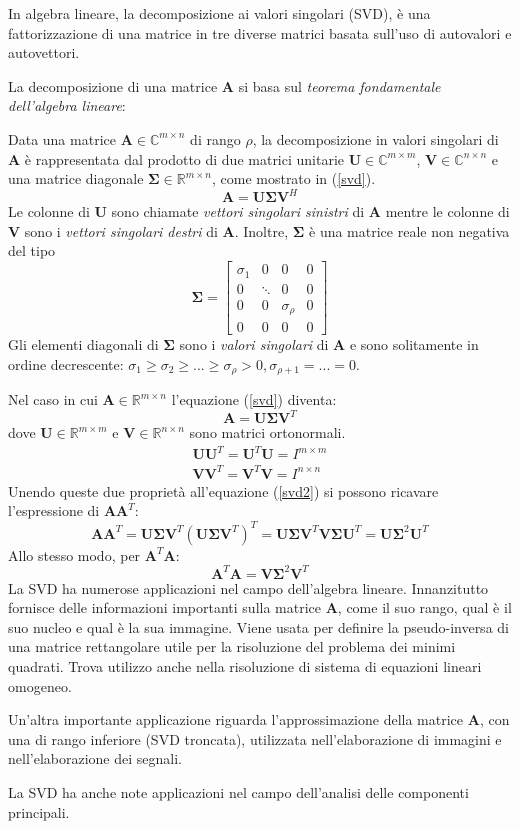 In algebra lineare, la decomposizione ai valori singolari (SVD), è una fattorizzazione di una matrice in tre diverse matrici basata sull'uso di autovalori e autovettori.

La decomposizione di una matrice $\mathbf{A}$ si basa sul \textit{teorema fondamentale dell'algebra lineare}: 

Data una matrice $\mathbf{A}\in\mathbb{C}^{m\times n}$ di rango $\rho$, la decomposizione in valori singolari di $\mathbf{A}$ è rappresentata dal prodotto di due matrici unitarie $\mathbf{U}\in\mathbb{C}^{m\times m}$, $\mathbf{V}\in\mathbb{C}^{n\times n}$ e una matrice diagonale $\mathbf{\Sigma}\in\mathbb{R}^{m\times n}$, come mostrato in (\ref{svd}).
\begin{equation}\label{svd}
\mathbf{A}=\mathbf{U}\mathbf{\Sigma}\mathbf{V}^H
\end{equation}
Le colonne di $\mathbf{U}$ sono chiamate \textit{vettori singolari sinistri} di $\mathbf{A}$ mentre le colonne di $\mathbf{V}$ sono i \textit{vettori singolari destri} di $\mathbf{A}$. Inoltre, $\mathbf{\Sigma}$ è una matrice reale non negativa del tipo
\[
\mathbf{\Sigma}=\begin{bmatrix}
\sigma_1 & 0 & 0 & 0\\
0 & \ddots & 0 & 0\\
0 & 0 & \sigma_{\rho} & 0\\
0 & 0 & 0 & 0
\end{bmatrix}
\]
Gli elementi diagonali di $\mathbf{\Sigma}$ sono i \textit{valori singolari} di $\mathbf{A}$ e sono solitamente in ordine decrescente: $\sigma_1 \geq \sigma_2 \geq ... \geq \sigma_{\rho} > 0, \sigma_{\rho+1}=...=0$.

Nel caso in cui $\mathbf{A}\in\mathbb{R}^{m\times n}$ l'equazione (\ref{svd}) diventa:
\begin{equation}\label{svd2}
\mathbf{A}=\mathbf{U}\mathbf{\Sigma}\mathbf{V}^T
\end{equation}
dove $\mathbf{U}\in\mathbb{R}^{m\times m}$ e $\mathbf{V}\in\mathbb{R}^{n\times n}$ sono matrici ortonormali.
\begin{eqnarray}
\mathbf{U}\mathbf{U}^T=\mathbf{U}^T\mathbf{U}=I^{m\times m}\\
\mathbf{V}\mathbf{V}^T=\mathbf{V}^T\mathbf{V}=I^{n\times n}
\end{eqnarray}
Unendo queste due proprietà all'equazione (\ref{svd2}) si possono ricavare l'espressione di $\mathbf{A}\mathbf{A}^T$:
\[
\mathbf{A}\mathbf{A}^T=\mathbf{U}\mathbf{\Sigma}\mathbf{V}^T(\mathbf{U}\mathbf{\Sigma}\mathbf{V}^T)^T=\mathbf{U}\mathbf{\Sigma}\mathbf{V}^T\mathbf{V}\mathbf{\Sigma}\mathbf{U}^T=\mathbf{U}\mathbf{\Sigma}^2\mathbf{U}^T
\]
Allo stesso modo, per $\mathbf{A}^T\mathbf{A}$:
\[
\mathbf{A}^T\mathbf{A}=\mathbf{V}\mathbf{\Sigma}^2\mathbf{V}^T
\]
La SVD ha numerose applicazioni nel campo dell'algebra lineare. Innanzitutto fornisce delle informazioni importanti sulla matrice $\mathbf{A}$, come il suo rango, qual è il suo nucleo e qual è la sua immagine. Viene usata per definire la pseudo-inversa di una matrice rettangolare utile per la risoluzione del problema dei minimi quadrati. Trova utilizzo anche nella risoluzione di sistema di equazioni lineari omogeneo.

Un'altra importante applicazione riguarda l'approssimazione della matrice $\mathbf{A}$, con una di rango inferiore (SVD troncata), utilizzata nell'elaborazione di immagini e nell'elaborazione dei segnali.

La SVD ha anche note applicazioni nel campo dell'analisi delle componenti principali.



